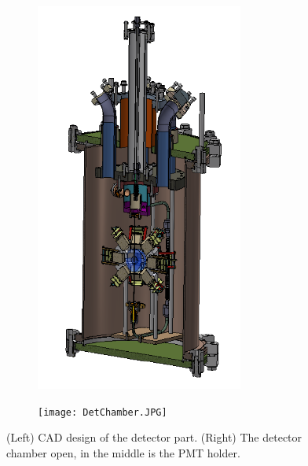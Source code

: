 \begin{figure}
	\centering
    \begin{subfigure}[b]{0.45\textwidth}
		\includegraphics[width=0.75\textwidth , height=0.3\textheight]{detCAD.png}%
	\end{subfigure}	
	\begin{subfigure}[b]{0.45\textwidth}
		\texttt{[image: DetChamber.JPG]}%
	\end{subfigure}	
		\caption{\label{fig:detector} (Left) CAD design of the detector part. (Right) The detector chamber open, in the middle is the PMT holder.}
	
\end{figure}

